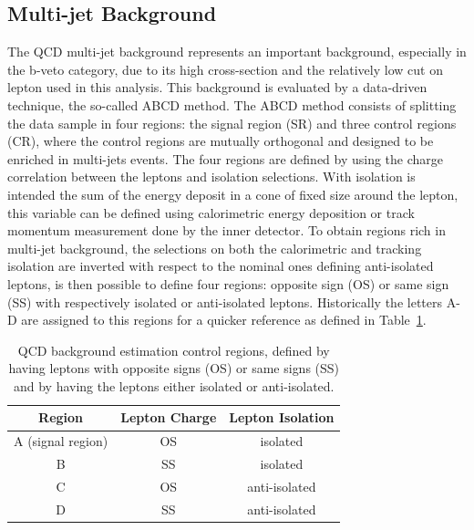 \subsection{Multi-jet Background}
\label{sec:qcd}

The QCD multi-jet background represents an important background, 
especially in the b-veto category, due to its high cross-section and the 
relatively low cut on lepton \pt used in this analysis. This
background is evaluated by a data-driven technique, the so-called ABCD method.
The ABCD method consists of splitting the data sample in four regions: the
 signal region (SR) and three control regions (CR), where the control
regions are mutually orthogonal and designed to be enriched in
multi-jets events. The four regions are defined by using the charge correlation
between the leptons and  isolation selections. With isolation
is intended the sum of the energy deposit in a cone of fixed size around the lepton,
this variable can be defined using calorimetric energy deposition or track momentum 
measurement done by the inner detector.
To obtain regions rich in multi-jet background, the selections on both
the calorimetric and tracking isolation are inverted with respect to the
nominal ones defining anti-isolated leptons, is then
possible to define four regions: opposite sign (OS) or same sign
(SS) with respectively isolated or anti-isolated leptons. Historically
the letters A-D are assigned to this regions for a quicker reference as
defined in Table~\ref{table:qcd}.

\begin{table} [tp]
\centering
\begin{tabular}{c c c }
\hline
Region & Lepton Charge & Lepton Isolation \\ [0.5ex]
\hline
A (signal region) & OS & isolated \\
B & SS & isolated \\
C & OS & anti-isolated \\
D & SS & anti-isolated \\ [1ex]
\hline
\end{tabular}
\caption{QCD background estimation control regions, defined by having leptons with opposite signs (OS) or same signs (SS) and by having the leptons either isolated or anti-isolated.}
\label{table:qcd}
\end{table}


